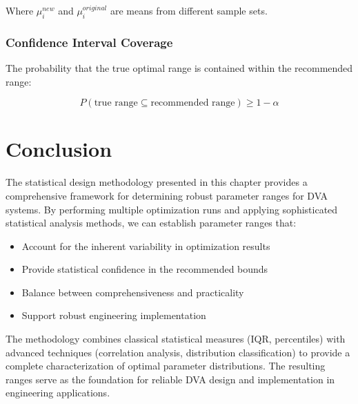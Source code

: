 \documentclass[../main.tex]{subfiles}
\begin{document}
Where $\mu_i^{new}$ and $\mu_i^{original}$ are means from different sample sets.

\subsubsection{Confidence Interval Coverage}

The probability that the true optimal range is contained within the recommended range:

\begin{equation}
P(\text{true range} \subseteq \text{recommended range}) \geq 1 - \alpha
\label{eq:confidence}
\end{equation}

\section{Conclusion}

The statistical design methodology presented in this chapter provides a comprehensive framework for determining robust parameter ranges for DVA systems. By performing multiple optimization runs and applying sophisticated statistical analysis methods, we can establish parameter ranges that:

\begin{itemize}
    \item Account for the inherent variability in optimization results
    \item Provide statistical confidence in the recommended bounds
    \item Balance between comprehensiveness and practicality
    \item Support robust engineering implementation
\end{itemize}

The methodology combines classical statistical measures (IQR, percentiles) with advanced techniques (correlation analysis, distribution classification) to provide a complete characterization of optimal parameter distributions. The resulting ranges serve as the foundation for reliable DVA design and implementation in engineering applications.
\end{document}
